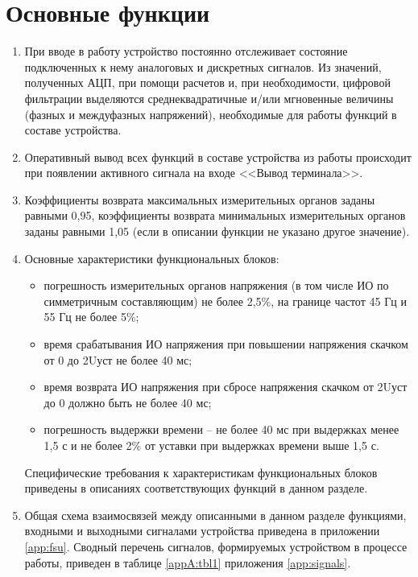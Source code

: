 \color{unimain}\section[Основные функции]{Основные функции}\label{sec:funcs}
\color{black}

\color{black}

\begin{enumerate}
    
\item
При вводе в работу устройство постоянно отслеживает состояние подключенных к нему аналоговых и дискретных сигналов. Из значений, полученных АЦП, при помощи расчетов и, при необходимости, цифровой фильтрации выделяются среднеквадратичные и/или мгновенные величины (фазных и междуфазных напряжений), необходимые для работы функций в составе устройства.
\item
Оперативный вывод всех функций в составе устройства из работы происходит при появлении активного сигнала на входе <<Вывод терминала>>.
\item
Коэффициенты возврата максимальных измерительных органов заданы равными 0,95, коэффициенты возврата минимальных измерительных органов заданы равными 1,05 (если в описании функции не указано другое значение).
\item
Основные характеристики функциональных блоков:
\begin{itemize}
    \item погрешность измерительных органов напряжения (в том числе ИО по симметричным составляющим) не более 2,5\%, на границе частот 45 Гц и 55 Гц не более 5\%;
    \item время срабатывания ИО напряжения при повышении напряжения скачком от 0 до 2Uуст не более 40 мс;
    \item время возврата ИО напряжения при сбросе напряжения скачком от 2Uуст до 0 должно быть не более 40 мс; 
    \item погрешность выдержки времени -- не более 40 мс при выдержках менее 1,5 с и не более 2\% от уставки при выдержках времени выше 1,5 с.
\end{itemize}
Специфические требования к характеристикам функциональных блоков приведены в описаниях соответствующих функций в данном разделе. 
\item
Общая схема взаимосвязей между описанными в данном разделе функциями, входными и выходными сигналами устройства приведена в приложении \ref{app:fsu}.
Сводный перечень сигналов, формируемых устройством в процессе работы, приведен в таблице \ref{appA:tbl1} приложения \ref{app:signals}.

\end{enumerate}
